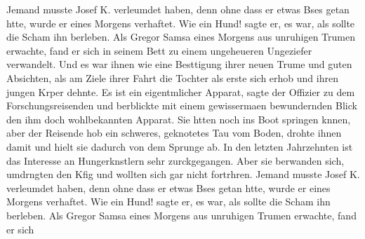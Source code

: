 \documentclass[12pt]{g-brief}
\begin{document}
\begin{g-brief}
Jemand musste Josef K. verleumdet haben, denn ohne dass er etwas Bses getan
htte, wurde er eines Morgens verhaftet. Wie ein Hund! sagte er, es war,
als sollte die Scham ihn berleben. Als Gregor Samsa eines Morgens aus
unruhigen Trumen erwachte, fand er sich in seinem Bett zu einem ungeheueren
Ungeziefer verwandelt. Und es war ihnen wie eine Besttigung ihrer neuen Trume
und guten Absichten, als am Ziele ihrer Fahrt die Tochter als erste sich erhob und
ihren jungen Krper dehnte. Es ist ein eigentmlicher Apparat, sagte der Offizier
zu dem Forschungsreisenden und berblickte mit einem gewissermaen bewundernden
Blick den ihm doch wohlbekannten Apparat. Sie htten noch ins Boot springen
knnen, aber der Reisende hob ein schweres, geknotetes Tau vom Boden, drohte ihnen
damit und hielt sie dadurch von dem Sprunge ab. In den letzten Jahrzehnten
ist das Interesse an Hungerknstlern sehr zurckgegangen.
Aber sie berwanden sich, umdrngten den Kfig und wollten sich gar nicht fortrhren.
Jemand musste Josef K. verleumdet haben, denn ohne dass er etwas Bses getan htte,
wurde er eines Morgens verhaftet. Wie ein Hund! sagte er, es war,
als sollte die Scham ihn berleben.
Als Gregor Samsa eines Morgens aus unruhigen Trumen erwachte, fand er sich
\end{g-brief}
\end{document}
